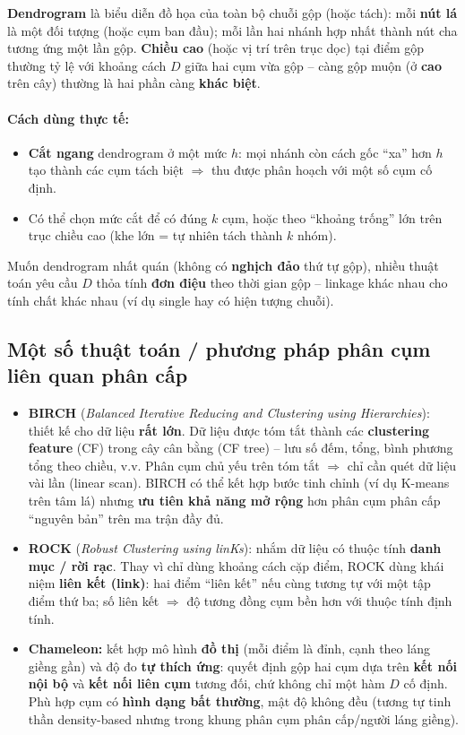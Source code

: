 \documentclass[10pt]{article}
\begin{document}
\textbf{Dendrogram} là biểu diễn đồ họa của toàn bộ chuỗi gộp (hoặc tách): mỗi \textbf{nút lá} là một đối tượng (hoặc cụm ban đầu); mỗi lần hai nhánh hợp nhất thành nút cha tương ứng một lần gộp. \textbf{Chiều cao} (hoặc vị trí trên trục dọc) tại điểm gộp thường tỷ lệ với khoảng cách $D$ giữa hai cụm vừa gộp -- càng gộp muộn (ở \textbf{cao} trên cây) thường là hai phần càng \textbf{khác biệt}.

\paragraph{Cách dùng thực tế:}
\begin{itemize}
    \item \textbf{Cắt ngang} dendrogram ở một mức $h$: mọi nhánh còn cách gốc ``xa'' hơn $h$ tạo thành các cụm tách biệt $\Rightarrow$ thu được phân hoạch với một số cụm cố định.
    \item Có thể chọn mức cắt để có đúng $k$ cụm, hoặc theo ``khoảng trống'' lớn trên trục chiều cao (khe lớn = tự nhiên tách thành $k$ nhóm).
\end{itemize}

Muốn dendrogram nhất quán (không có \textbf{nghịch đảo} thứ tự gộp), nhiều thuật toán yêu cầu $D$ thỏa tính \textbf{đơn điệu} theo thời gian gộp -- linkage khác nhau cho tính chất khác nhau (ví dụ single hay có hiện tượng chuỗi).

\subsection{Một số thuật toán / phương pháp phân cụm liên quan phân cấp}

\begin{itemize}
    \item \textbf{BIRCH} (\textit{Balanced Iterative Reducing and Clustering using Hierarchies}): thiết kế cho dữ liệu \textbf{rất lớn}. Dữ liệu được tóm tắt thành các \textbf{clustering feature} (CF) trong cây cân bằng (CF tree) -- lưu số đếm, tổng, bình phương tổng theo chiều, v.v. Phân cụm chủ yếu trên tóm tắt $\Rightarrow$ chỉ cần quét dữ liệu vài lần (linear scan). BIRCH có thể kết hợp bước tinh chỉnh (ví dụ K-means trên tâm lá) nhưng \textbf{ưu tiên khả năng mở rộng} hơn phân cụm phân cấp ``nguyên bản'' trên ma trận đầy đủ.

    \item \textbf{ROCK} (\textit{Robust Clustering using linKs}): nhắm dữ liệu có thuộc tính \textbf{danh mục / rời rạc}. Thay vì chỉ dùng khoảng cách cặp điểm, ROCK dùng khái niệm \textbf{liên kết (link)}: hai điểm ``liên kết'' nếu cùng tương tự với một tập điểm thứ ba; số liên kết $\Rightarrow$ độ tương đồng cụm bền hơn với thuộc tính định tính.

    \item \textbf{Chameleon:} kết hợp mô hình \textbf{đồ thị} (mỗi điểm là đỉnh, cạnh theo láng giềng gần) và độ đo \textbf{tự thích ứng}: quyết định gộp hai cụm dựa trên \textbf{kết nối nội bộ} và \textbf{kết nối liên cụm} tương đối, chứ không chỉ một hàm $D$ cố định. Phù hợp cụm có \textbf{hình dạng bất thường}, mật độ không đều (tương tự tinh thần density-based nhưng trong khung phân cụm phân cấp/người láng giềng).
\end{itemize}
\end{document}
